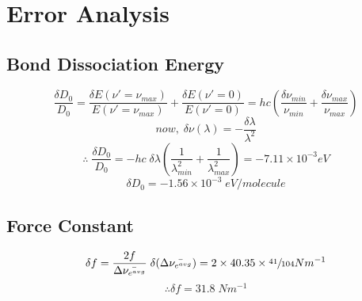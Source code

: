 \section{Error Analysis}

    \subsection{Bond Dissociation Energy}
        $$\frac{\delta D_0}{D_0} = \frac{\delta E(\nu'=\nu_{max})}{E(\nu'=\nu_{max})} + \frac{\delta E(\nu'=0)}{E(\nu'=0)} = hc\left(\frac{\delta \nu_{min}}{\nu_{min}} + \frac{\delta \nu_{max}}{\nu_{max}}\right)$$
        $$now,\;\delta \nu (\lambda)= -\frac{\delta\lambda}{\lambda^2}$$
        $$\therefore\; \frac{\delta D_0}{D_0} = -hc\;\delta\lambda\left(\frac{1}{\lambda_{min}^2} + \frac{1}{\lambda_{max}^2}\right) = -7.11\times10^{-3}eV$$
        $$\delta D_0 = -1.56\times10^{-3}\;eV/molecule$$

    \subsection{Force Constant}
        $$\delta f = \frac{2f}{\Delta\bar{\nu_{e^{avg}}}} \; \delta(\Delta\bar{\nu_{e^{avg}}}) = 2\times 40.35 \times \sfrac{41}{104} Nm^{-1}$$
        $$\therefore \delta f = 31.8\;N m^{-1}$$